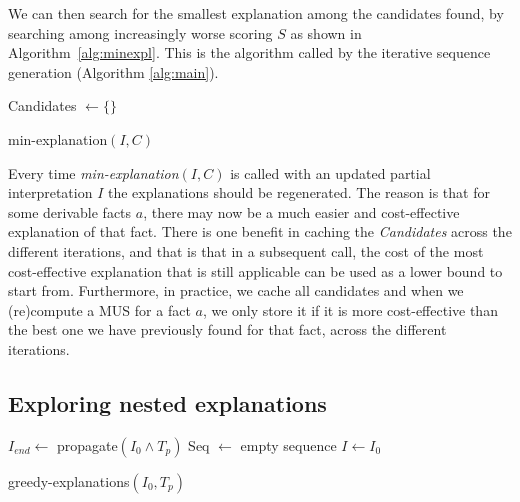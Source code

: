 We can then search for the smallest explanation among the candidates found, by searching among increasingly worse scoring $S$ as shown in Algorithm~\ref{alg:minexpl}. This is the algorithm called by the iterative sequence generation (Algorithm \ref{alg:main}).

\begin{algorithm}


  Candidates $\gets \{\}$\;
\caption{min-explanation$(I,C)$}
\label{alg:minexpl}
\end{algorithm}

Every time \textit{min-explanation$(I,C)$} is called with an updated partial interpretation $I$ the explanations should be regenerated. The reason is that for some derivable facts $a$, there may now be a much easier and cost-effective explanation of that fact.
There is one benefit in caching the \textit{Candidates} across the different iterations, and that is that in a subsequent call, the cost of the most cost-effective explanation that is still applicable can be used as a lower bound to start from.
Furthermore, in practice, we cache all candidates and when we (re)compute a MUS for a fact $a$, we only store it if it is more cost-effective than the best one we have previously found for that fact, across the different iterations.

\subsection{Exploring nested explanations}

\begin{algorithm}
  $I_{end} \gets$ propagate$(I_0\land T_p)$\;
  Seq $\gets$ empty sequence\;
  $I \gets I_0$\;
  \caption{greedy-explanations$(I_0, T_p)$}
  \label{alg:main}
  \end{algorithm}
  
